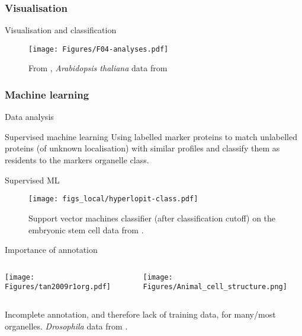 \subsubsection*{Visualisation}
\label{sec:viz}

\begin{frame}{Visualisation and classification}
  \begin{figure}
    \centering
    \texttt{[image: Figures/F04-analyses.pdf]}
    \caption{From \cite{Gatto:2010}, \textit{Arabidopsis thaliana} data
      from \cite{Dunkley:2006}}
  \end{figure}   
\end{frame}

\subsubsection*{Machine learning}
\label{sec:ml}

\begin{frame}{Data analysis}
  \begin{centering}

    \begin{block}{Supervised machine learning}    
      Using labelled marker proteins to match unlabelled proteins (of
      unknown localisation) with similar profiles and classify them as
      residents to the markers organelle class.
    \end{block}
  \end{centering}
\end{frame}


\begin{frame}{Supervised ML}
  \begin{figure}[h]
    \centering 
    \texttt{[image: figs\_local/hyperlopit-class.pdf]}
    \caption{Support vector machines classifier (after classification
      cutoff) on the embryonic stem cell data from
      \cite{Christoforou:2016}.}
  \end{figure}
\end{frame}


\begin{frame}{Importance of annotation}
  \begin{columns}[t]
    \begin{column}[T]{0.43\textwidth}
      \begin{centering}
        \texttt{[image: Figures/tan2009r1org.pdf]}
      \end{centering} 
    \end{column}
    \begin{column}[T]{0.56\textwidth}      
      \texttt{[image: Figures/Animal\_cell\_structure.png]}
    \end{column}
  \end{columns}          
  Incomplete annotation, and therefore lack of training data, for
  many/most organelles. \textit{Drosophila} data from \cite{Tan2009}.
\end{frame}

